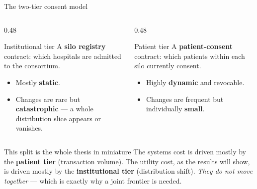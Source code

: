 \documentclass[aspectratio=169, 11pt]{beamer}
\begin{document}
\begin{frame}{The two-tier consent model}
\begin{columns}[T]
\begin{column}{0.48\textwidth}
\begin{block}{Institutional tier}
A \textbf{silo registry} contract: which hospitals are admitted to the
consortium.
\begin{itemize}\small
\item Mostly \textbf{static}.
\item Changes are rare but \textbf{catastrophic} --- a whole distribution
      slice appears or vanishes.
\end{itemize}
\end{block}
\end{column}
\begin{column}{0.48\textwidth}
\begin{block}{Patient tier}
A \textbf{patient-consent} contract: which patients within each silo currently
consent.
\begin{itemize}\small
\item Highly \textbf{dynamic} and revocable.
\item Changes are frequent but individually \textbf{small}.
\end{itemize}
\end{block}
\end{column}
\end{columns}
\vspace{0.7em}
\begin{alertblock}{This split is the whole thesis in miniature}
The systems cost is driven mostly by the \textbf{patient tier} (transaction
volume). The utility cost, as the results will show, is driven mostly by the
\textbf{institutional tier} (distribution shift). \emph{They do not move
together} --- which is exactly why a joint frontier is needed.
\end{alertblock}
\end{frame}
\end{document}
